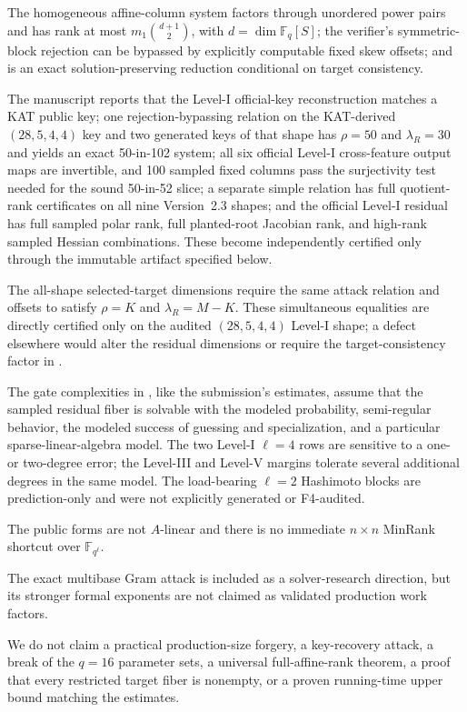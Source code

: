 \documentclass[11pt]{article}
\newcommand{\F}{\mathbb F}
\begin{document}
\begin{description}[leftmargin=0pt]
\item[Proved algebraically.] The homogeneous affine-column system factors through unordered power pairs and has rank at most $m_1\binom{d+1}{2}$, with $d=\dim\F_q[S]$; the verifier's symmetric-block rejection can be bypassed by explicitly computable fixed skew offsets; and  is an exact solution-preserving reduction conditional on target consistency.
\item[Author-reported computations.] The manuscript reports that the Level-I official-key reconstruction matches a KAT public key; one rejection-bypassing relation on the KAT-derived $(28,5,4,4)$ key and two generated keys of that shape has $\rho=50$ and $\lambda_R=30$ and yields an exact 50-in-102 system; all six official Level-I cross-feature output maps are invertible, and 100 sampled fixed columns pass the surjectivity test needed for the sound 50-in-52 slice; a separate simple relation has full quotient-rank certificates on all nine Version~2.3 shapes; and the official Level-I residual has full sampled polar rank, full planted-root Jacobian rank, and high-rank sampled Hessian combinations.  These become independently certified only through the immutable artifact specified below.
\item[Assumed for untested shapes.] The all-shape selected-target dimensions require the same attack relation and offsets to satisfy $\rho=K$ and $\lambda_R=M-K$.  These simultaneous equalities are directly certified only on the audited $(28,5,4,4)$ Level-I shape; a defect elsewhere would alter the residual dimensions or require the target-consistency factor in .
\item[Estimated heuristically.] The gate complexities in , like the submission's estimates, assume that the sampled residual fiber is solvable with the modeled probability, semi-regular behavior, the modeled success of guessing and specialization, and a particular sparse-linear-algebra model.  The two Level-I $\ell=4$ rows are sensitive to a one- or two-degree error; the Level-III and Level-V margins tolerate several additional degrees in the same model.  The load-bearing $\ell=2$ Hashimoto blocks are prediction-only and were not explicitly generated or F4-audited.
\item[Audited negative result.] The public forms are not $A$-linear and there is no immediate $n\times n$ MinRank shortcut over $\F_{q^\ell}$.
\item[Preliminary extension.] The exact multibase Gram attack is included as a solver-research direction, but its stronger formal exponents are not claimed as validated production work factors.
\item[Not claimed.] We do not claim a practical production-size forgery, a key-recovery attack, a break of the $q=16$ parameter sets, a universal full-affine-rank theorem, a proof that every restricted target fiber is nonempty, or a proven running-time upper bound matching the estimates.
\end{description}
\end{document}

